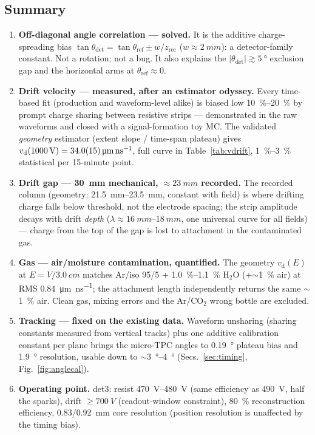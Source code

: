 \documentclass[11pt,a4paper]{article}
\newcommand{\vd}{v_{\mathrm{d}}}
\newcommand{\thref}{\theta_{\mathrm{ref}}}
\newcommand{\thdet}{\theta_{\mathrm{det}}}
\newcommand{\umns}{\micro\meter\per\nano\second}
\begin{document}
\subsection{Summary}

\begin{enumerate}
  \item \textbf{Off-diagonal angle correlation --- solved.}  It is the
        additive charge-spreading bias
        $\tan\thdet = \tan\thref \pm w/z_{\mathrm{rec}}$
        ($w\approx\SI{2}{mm}$): a detector-family constant.  Not a
        rotation; not a bug.  It also explains the
        $|\thdet|\gtrsim\SI{5}{\degree}$ exclusion gap and the horizontal
        arms at $\thref\approx0$.
  \item \textbf{Drift velocity --- measured, after an estimator odyssey.}
        Every time-based fit (production and waveform-level alike) is
        biased low \SIrange{10}{20}{\percent} by prompt charge sharing
        between resistive strips --- demonstrated in the raw waveforms and
        closed with a signal-formation toy MC.  The validated
        \emph{geometry} estimator (extent slope / time-span plateau) gives
        $\vd(\SI{1000}{V}) = \SI{34\pm1.5}{\umns}$, full curve in
        Table~\ref{tab:vdrift}, \SIrange{1}{3}{\percent} statistical per
        15-minute point.
  \item \textbf{Drift gap --- \SI{30}{mm} mechanical, $\approx\SI{23}{mm}$
        recorded.}  The recorded column (geometry: \SIrange{21.5}{23.5}{mm},
        constant with field) is where drifting charge falls below threshold,
        not the electrode spacing; the strip amplitude decays with drift
        \emph{depth} ($\lambda\approx\SIrange{16}{18}{mm}$, one universal
        curve for all fields) --- charge from the top of the gap is lost to
        attachment in the contaminated gas.
  \item \textbf{Gas --- air/moisture contamination, quantified.}  The
        geometry $\vd(E)$ at $E=V/\SI{3.0}{cm}$ matches Ar/iso 95/5 +
        \SIrange{1.0}{1.1}{\percent} H$_2$O (+$\sim$\SI{1}{\percent} air) at
        RMS \SI{0.84}{\umns}; the attachment length independently returns
        the same $\sim$\SI{1}{\percent} air.  Clean gas, mixing errors and
        the Ar/CO$_2$ wrong bottle are excluded.
  \item \textbf{Tracking --- fixed on the existing data.}  Waveform
        unsharing (sharing constants measured from vertical tracks) plus
        one additive calibration constant per plane brings the micro-TPC
        angles to \SI{0.19}{\degree} plateau bias and \SI{1.9}{\degree}
        resolution, usable down to $\sim$\SIrange{3}{4}{\degree}
        (Secs.~\ref{sec:timing}, Fig.~\ref{fig:anglecal}).
  \item \textbf{Operating point.}  det3: resist \SIrange{470}{480}{V}
        (same efficiency as \SI{490}{V}, half the sparks), drift
        $\geq\SI{700}{V}$ (readout-window constraint), \SI{80}{\percent}
        reconstruction efficiency, \SI{0.83}{}/\SI{0.92}{mm} core
        resolution (position resolution is unaffected by the timing bias).
\end{enumerate}
\end{document}
